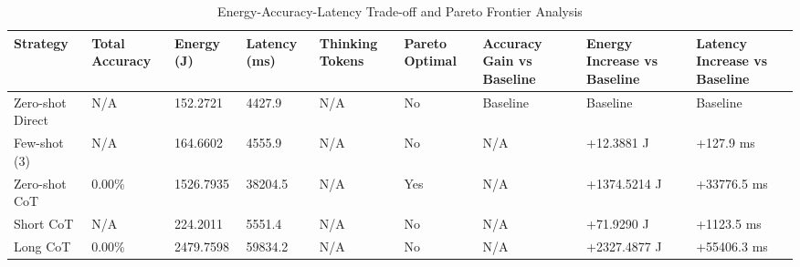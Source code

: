\begin{table}
\caption{Energy-Accuracy-Latency Trade-off and Pareto Frontier Analysis}
\label{tab:tradeoff_comparison}
\begin{tabular}{lllllllll}
\toprule
Strategy & Total Accuracy & Energy (J) & Latency (ms) & Thinking Tokens & Pareto Optimal & Accuracy Gain vs Baseline & Energy Increase vs Baseline & Latency Increase vs Baseline \\
\midrule
Zero-shot Direct & N/A & 152.2721 & 4427.9 & N/A & No & Baseline & Baseline & Baseline \\
Few-shot (3) & N/A & 164.6602 & 4555.9 & N/A & No & N/A & +12.3881 J & +127.9 ms \\
Zero-shot CoT & 0.00\% & 1526.7935 & 38204.5 & N/A & Yes & N/A & +1374.5214 J & +33776.5 ms \\
Short CoT & N/A & 224.2011 & 5551.4 & N/A & No & N/A & +71.9290 J & +1123.5 ms \\
Long CoT & 0.00\% & 2479.7598 & 59834.2 & N/A & No & N/A & +2327.4877 J & +55406.3 ms \\
\bottomrule
\end{tabular}
\end{table}
